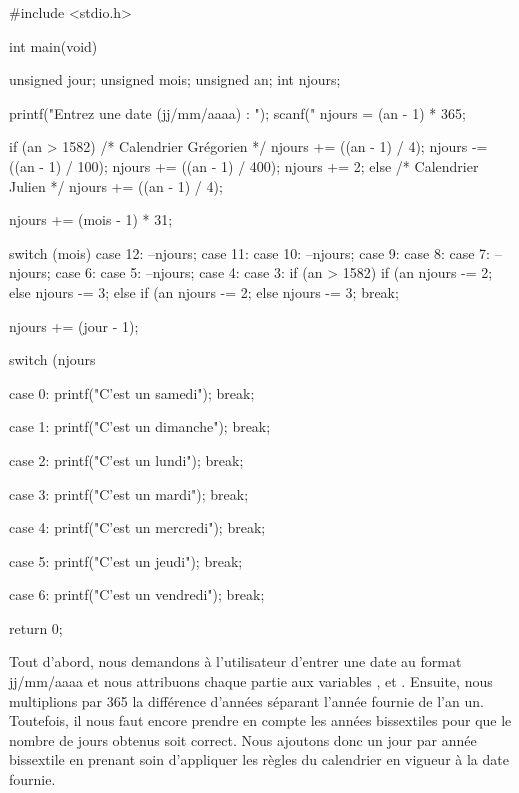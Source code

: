 \begin{C}
 #include <stdio.h>


int
main(void)
{
    unsigned jour;
    unsigned mois;
    unsigned an;
    int njours;

    printf("Entrez une date (jj/mm/aaaa) : ");
    scanf("%
    njours = (an - 1) * 365;

    if (an > 1582) /* Calendrier Grégorien */
    {
        njours += ((an - 1) / 4);
        njours -= ((an - 1) / 100);
        njours += ((an - 1) / 400);
        njours += 2;
    }
    else /* Calendrier Julien */
        njours += ((an - 1) / 4);

    njours += (mois - 1) * 31;

    switch (mois)
    {
    case 12:
        --njours;
    case 11:
    case 10:
        --njours;
    case 9:
    case 8:
    case 7:
        --njours;
    case 6:
    case 5:
        --njours;
    case 4:
    case 3:
        if (an > 1582)
        {
            if (an %
                njours -= 2;
            else
                njours -= 3;
        }
        else
        {
            if (an %
                njours -= 2;
            else
                njours -= 3;
        }
        break;
    }


    njours += (jour - 1);

    switch (njours %
    {
    case 0:
        printf("C'est un samedi\n");
        break;

    case 1:
        printf("C'est un dimanche\n");
        break;

    case 2:
        printf("C'est un lundi\n");
        break;

    case 3:
        printf("C'est un mardi\n");
        break;

    case 4:
        printf("C'est un mercredi\n");
        break;

    case 5:
        printf("C'est un jeudi\n");
        break;

    case 6:
        printf("C'est un vendredi\n");
        break;
    }
    
    return 0;
}
\end{C}

Tout d'abord, nous demandons à l'utilisateur d'entrer une date au format
jj/mm/aaaa et nous attribuons chaque partie aux variables ,
 et . Ensuite, nous multiplions par 365 la
différence d'années séparant l'année fournie de l'an un. Toutefois, il
nous faut encore prendre en compte les années bissextiles pour que le
nombre de jours obtenus soit correct. Nous ajoutons donc un jour par
année bissextile en prenant soin d'appliquer les règles du calendrier en
vigueur à la date fournie.


